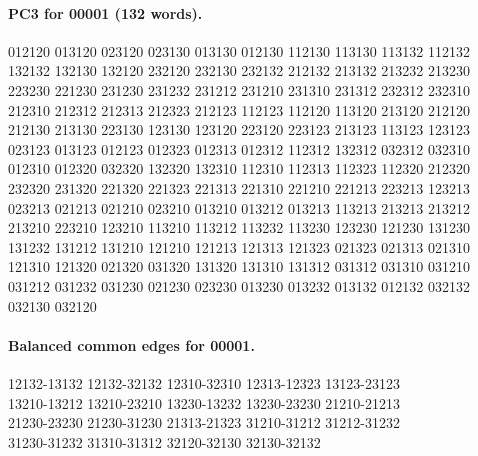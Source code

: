 \documentclass[11pt]{article}
\theoremstyle{remark}
\numberwithin{equation}{section}
\begin{document}
\paragraph{PC3 for 00001 (132 words).}
\begingroup\footnotesize\ttfamily\begin{flushleft}
012120 013120 023120 023130 013130 012130 112130 113130 113132 112132\\
132132 132130 132120 232120 232130 232132 212132 213132 213232 213230\\
223230 221230 231230 231232 231212 231210 231310 231312 232312 232310\\
212310 212312 212313 212323 212123 112123 112120 113120 213120 212120\\
212130 213130 223130 123130 123120 223120 223123 213123 113123 123123\\
023123 013123 012123 012323 012313 012312 112312 132312 032312 032310\\
012310 012320 032320 132320 132310 112310 112313 112323 112320 212320\\
232320 231320 221320 221323 221313 221310 221210 221213 223213 123213\\
023213 021213 021210 023210 013210 013212 013213 113213 213213 213212\\
213210 223210 123210 113210 113212 113232 113230 123230 121230 131230\\
131232 131212 131210 121210 121213 121313 121323 021323 021313 021310\\
121310 121320 021320 031320 131320 131310 131312 031312 031310 031210\\
031212 031232 031230 021230 023230 013230 013232 013132 012132 032132\\
032130 032120\\
\end{flushleft}\endgroup
\paragraph{Balanced common edges for 00001.}
\begingroup\footnotesize\ttfamily\begin{flushleft}
12132-13132 12132-32132 12310-32310 12313-12323 13123-23123\\
13210-13212 13210-23210 13230-13232 13230-23230 21210-21213\\
21230-23230 21230-31230 21313-21323 31210-31212 31212-31232\\
31230-31232 31310-31312 32120-32130 32130-32132\\
\end{flushleft}\endgroup
\end{document}
